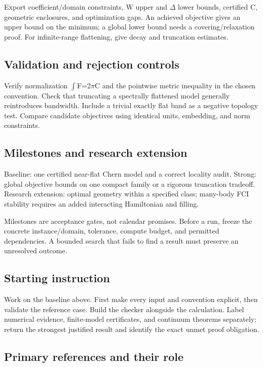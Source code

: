 \documentclass[
  11pt,
]{article}
\begin{document}
Export coefficient/domain constraints, W upper and \ensuremath{\Delta}
lower bounds, certified C, geometric enclosures, and optimization gaps.
An achieved objective gives an upper bound on the minimum; a global
lower bound needs a covering/relaxation proof. For infinite-range
flattening, give decay and truncation estimates.

\subsection{Validation and rejection controls}

Verify normalization \ensuremath{\int}F=2\ensuremath{\pi}C and the
pointwise metric inequality in the chosen convention. Check that
truncating a spectrally flattened model generally reintroduces
bandwidth. Include a trivial exactly flat band as a negative topology
test. Compare candidate objectives using identical units, embedding, and
norm constraints.

\subsection{Milestones and research extension}

Baseline: one certified near-flat Chern model and a correct locality
audit. Strong: global objective bounds on one compact family or a
rigorous truncation tradeoff. Research extension: optimal geometry
within a specified class; many-body FCI stability requires an added
interacting Hamiltonian and filling.

Milestones are acceptance gates, not calendar promises. Before a run,
freeze the concrete instance/domain, tolerance, compute budget, and
permitted dependencies. A bounded search that fails to find a result
must preserve an unresolved outcome.

\subsection{Starting instruction}

Work on the baseline above. First make every input and convention
explicit, then validate the reference case. Build the checker alongside
the calculation. Label numerical evidence, finite-model certificates,
and continuum theorems separately; return the strongest justified result
and identify the exact unmet proof obligation.

\subsection{Primary references and their role}
\end{document}
